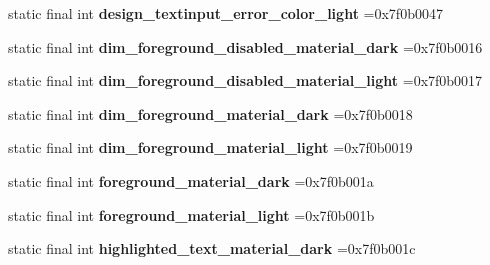 \begin{DoxyCompactItemize}
\mbox{\label{classproject4_1_1xaria_1_1R_1_1color_a31312e58dc69499bed71f7e03e91b6f6}} 
static final int {\bfseries design\+\_\+textinput\+\_\+error\+\_\+color\+\_\+light} =0x7f0b0047
\item 
\mbox{\label{classproject4_1_1xaria_1_1R_1_1color_a39b242c69abcad36029c7c9584d64465}} 
static final int {\bfseries dim\+\_\+foreground\+\_\+disabled\+\_\+material\+\_\+dark} =0x7f0b0016
\item 
\mbox{\label{classproject4_1_1xaria_1_1R_1_1color_aeba05f9f729483d8c973d25791b4c041}} 
static final int {\bfseries dim\+\_\+foreground\+\_\+disabled\+\_\+material\+\_\+light} =0x7f0b0017
\item 
\mbox{\label{classproject4_1_1xaria_1_1R_1_1color_aeab0c84801e14e63e3767dc84bfcbab2}} 
static final int {\bfseries dim\+\_\+foreground\+\_\+material\+\_\+dark} =0x7f0b0018
\item 
\mbox{\label{classproject4_1_1xaria_1_1R_1_1color_a8cd7d52b44017f4548a487e222559013}} 
static final int {\bfseries dim\+\_\+foreground\+\_\+material\+\_\+light} =0x7f0b0019
\item 
\mbox{\label{classproject4_1_1xaria_1_1R_1_1color_aca35d1b96ffd0b7dcc64a65adea13bde}} 
static final int {\bfseries foreground\+\_\+material\+\_\+dark} =0x7f0b001a
\item 
\mbox{\label{classproject4_1_1xaria_1_1R_1_1color_a727f692ef519611d804cfa811dc96f3a}} 
static final int {\bfseries foreground\+\_\+material\+\_\+light} =0x7f0b001b
\item 
\mbox{\label{classproject4_1_1xaria_1_1R_1_1color_aa2b65ae7d53a36f651e011ed46c113d5}} 
static final int {\bfseries highlighted\+\_\+text\+\_\+material\+\_\+dark} =0x7f0b001c
\item 
\mbox{\label{classproject4_1_1xaria_1_1R_1_1color_a4dc86bc19397784e71f81e29114adec9}} 

\end{DoxyCompactItemize}
